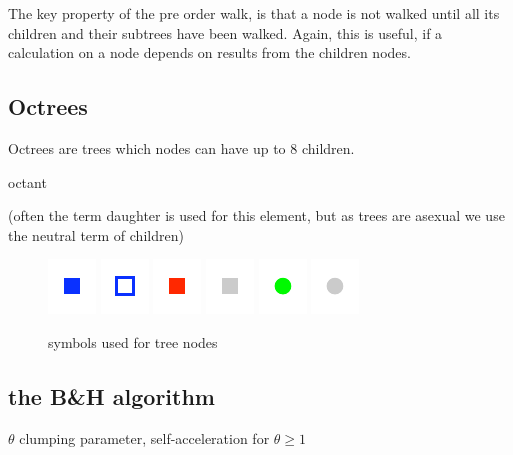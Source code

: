 The key property of the pre order walk, is that a node is not walked until all its children and their subtrees have been walked. Again, this is useful, if a calculation on a node depends on results from the children nodes.

\subsection{Octrees}
Octrees are trees which nodes can have up to $8$ children. 

octant

(often the term daughter is used for this element, but as trees are asexual we use the neutral term of children)


\begin{figure}[htbp]
\begin{center}
\includegraphics{ttnode_filled_local.pdf}
\includegraphics{ttnode_empty_local.pdf}
\includegraphics{node_filled_local.pdf}
\includegraphics{node_filled_remote.pdf}
\hspace{1cm}
\includegraphics{particle_filled_local.pdf}
\includegraphics{particle_filled_remote.pdf}
\caption{symbols used for tree nodes}
\label{fig:nodetypes}
\end{center}
\end{figure}


\subsection{the B\&H algorithm}
$\theta$ clumping parameter, self-acceleration for $\theta \ge 1$
